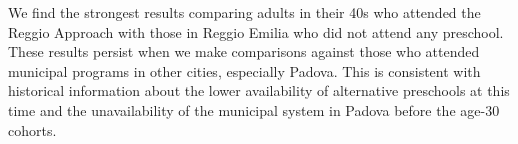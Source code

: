 We find the strongest results comparing adults in their 40s who attended the Reggio Approach with those in Reggio Emilia who did not attend any preschool. These results persist when we make comparisons against those who attended municipal programs in other cities, especially Padova. This is consistent with historical information about the lower availability of alternative preschools at this time and the unavailability of the municipal system in Padova before the age-30 cohorts.
